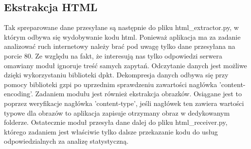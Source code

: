\documentclass[12pt]{article}
\begin{document}
\subsection{Ekstrakcja HTML}
Tak spreparowane dane przesyłane są następnie do pliku html\_extractor.py, w którym odbywa się wydobywanie kodu html. 
Ponieważ aplikacja ma za zadanie analizować ruch internetowy należy brać pod uwagę tylko dane przesyłana na porcie 80. Ze względu na fakt, że interesują nas tylko odpowiedzi serwera omawiany moduł ignoruje treść samych zapytań. Odczytanie danych jest możliwe dzięki wykorzystaniu biblioteki dpkt. Dekompresja danych odbywa się przy pomocy biblioteki gzpi po uprzednim sprawdzeniu zawartości nagłówka 'content-encoding'. Zadaniem modułu jest również ekstrakcja obrazków. Osiągane jest to poprzez weryfikacje nagłówka 'content-type', jeśli nagłówek ten zawiera wartości typowe dla obrazów to aplikacja zapisuje otrzymany obraz w dedykowanym folderze. Ostatecznie moduł przesyła dane dalej do pliku html\_receiver.py, którego zadaniem jest właściwie tylko dalsze przekazanie kodu do usług odpowiedzialnych za analizę statystyczną.
\end{document}

